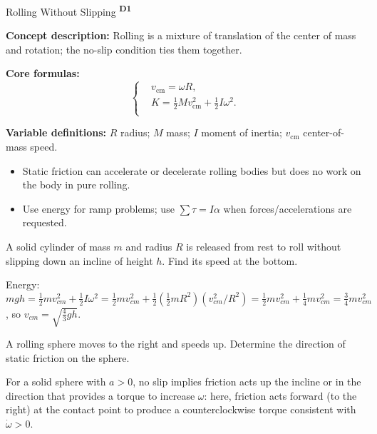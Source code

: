 ﻿\documentclass[12pt,a4paper]{article}
\providecommand{\KPFormulas}{}
\providecommand{\KPHeuristics}{}
\providecommand{\KPProblems}{}
\newcommand{\DOne}{\texorpdfstring{\textsuperscript{\textbf{D1}}}{ D1}}
\begin{document}
\begin{KnowledgePoint}{Rolling Without Slipping \DOne}
  \KPFormulas
  \begin{formulabox}
  \textbf{Concept description:} Rolling is a mixture of translation of the center of mass and rotation; the no-slip condition ties them together.

  \textbf{Core formulas:}
  \[
  \left\{\begin{aligned}
    &v_{\text{cm}}=\omega R,\\
    &K=\tfrac12 M v_{\text{cm}}^2+\tfrac12 I\omega^2.\\
  \end{aligned}\right.
  \]

  \textbf{Variable definitions:} $R$ radius; $M$ mass; $I$ moment of inertia; $v_{\text{cm}}$ center-of-mass speed.
  \end{formulabox}

  \KPHeuristics
  \begin{heuristicsbox}
  \begin{itemize}[leftmargin=*]
    \item Static friction can accelerate or decelerate rolling bodies but does no work on the body in pure rolling.
    \item Use energy for ramp problems; use $\sum \tau=I\alpha$ when forces/accelerations are requested.
  \end{itemize}
  \end{heuristicsbox}

  \KPProblems
  \begin{cheatproblem}
  A solid cylinder of mass $m$ and radius $R$ is released from rest to roll without slipping down an incline of height $h$. Find its speed at the bottom.
  \begin{solutionbox}
  Energy: $mgh=\tfrac12 m v_{cm}^2+\tfrac12 I\omega^2=\tfrac12 m v_{cm}^2+\tfrac12(\tfrac12 mR^2)(v_{cm}^2/R^2)=\tfrac12 m v_{cm}^2+\tfrac14 m v_{cm}^2=\tfrac34 m v_{cm}^2$, so $v_{cm}=\sqrt{\tfrac{4}{3}gh}$.
  \end{solutionbox}
  \end{cheatproblem}
  \begin{cheatproblem}
  A rolling sphere moves to the right and speeds up. Determine the direction of static friction on the sphere.
  \begin{solutionbox}
  For a solid sphere with $a>0$, no slip implies friction acts up the incline or in the direction that provides a torque to increase $\omega$: here, friction acts forward (to the right) at the contact point to produce a counterclockwise torque consistent with $\dot\omega>0$.
  \end{solutionbox}
  \end{cheatproblem}
\end{KnowledgePoint}
\end{document}
